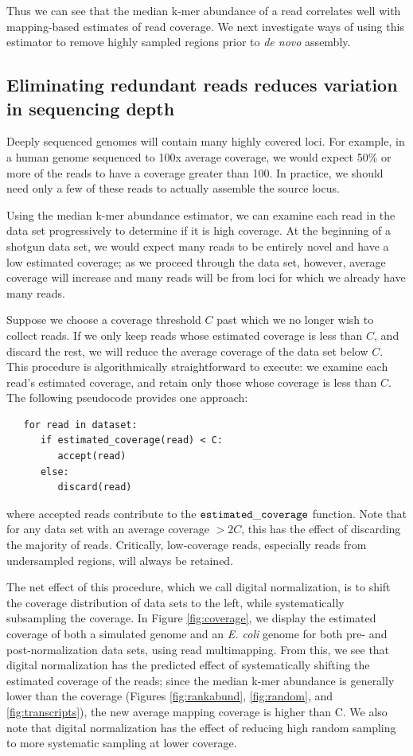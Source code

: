 \documentclass{pnastwo}
\begin{document}
\begin{article}
Thus we can see that the median k-mer abundance of a read correlates
well with mapping-based estimates of read coverage.
We next investigate ways of using this estimator to remove highly
sampled regions prior to {\em de novo} assembly.

\subsection{Eliminating redundant reads reduces variation in sequencing depth}

Deeply sequenced genomes will contain many highly covered loci.  For
example, in a human genome sequenced to 100x average coverage, we would
expect 50\% or more of the reads to have a coverage greater than 100.
In practice, we should need only a few of these reads to actually assemble
the source locus.

Using the median k-mer abundance estimator, we can examine each read
in the data set progressively to determine if it is high coverage.  At
the beginning of a shotgun data set, we would expect many reads to be
entirely novel and have a low estimated coverage; as we proceed
through the data set, however, average coverage will increase and many
reads will be from loci for which we already have many reads.

Suppose we choose a coverage threshold $C$ past which we no longer
wish to collect reads. If we only keep reads whose estimated coverage
is less than $C$, and discard the rest, we will reduce the average
coverage of the data set below $C$.  This procedure is
algorithmically straightforward to execute: we examine each read's
estimated coverage, and retain only those whose coverage is less than $C$.
The following pseudocode provides one approach:
\begin{verbatim}
   for read in dataset:
      if estimated_coverage(read) < C:
         accept(read)
      else:
         discard(read)
\end{verbatim}
\noindent
where accepted reads contribute to the $\tt estimated\_coverage$
function.  Note that for any data set with an average coverage $> 2C$,
this has the effect of discarding the majority of reads.  Critically,
low-coverage reads, especially reads from undersampled regions, will
always be retained.

The net effect of this procedure, which we call digital normalization,
is to shift the coverage distribution of data sets to the left, while
systematically subsampling the coverage.  In Figure
\ref{fig:coverage}, we display the estimated coverage of both a
simulated genome and an {\em E. coli} genome for both pre- and
post-normalization data sets, using read multimapping.  From this, we
see that digital normalization has the predicted effect of
systematically shifting the estimated coverage of the reads; since the
median k-mer abundance is generally lower than the coverage (Figures
\ref{fig:rankabund}, \ref{fig:random}, and \ref{fig:transcripts}), the
new average mapping coverage is higher than C.  We also note that
digital normalization has the effect of reducing high random sampling
to more systematic sampling at lower coverage.


\end{article}
\end{document}
